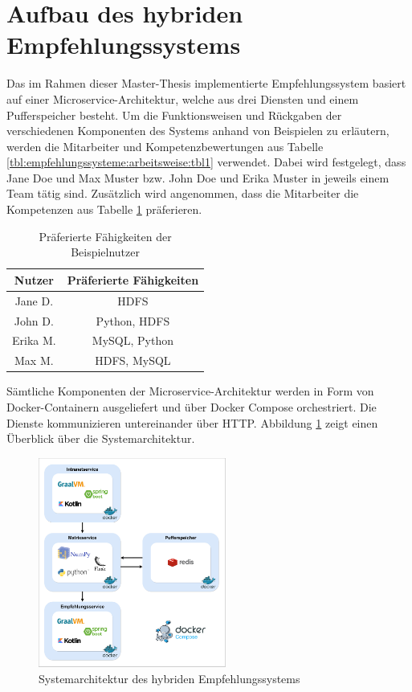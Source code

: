 \section{Aufbau des hybriden Empfehlungssystems}
\label{ch:methodik:versuchsaufbau:systemarchitektur}
Das im Rahmen dieser Master-Thesis implementierte Empfehlungssystem basiert auf einer Microservice-Architektur, welche aus drei Diensten und einem Pufferspeicher besteht. Um die Funktionsweisen und Rückgaben der verschiedenen Komponenten des Systems anhand von Beispielen zu erläutern, werden die Mitarbeiter und Kompetenzbewertungen aus Tabelle \ref{tbl:empfehlungssysteme:arbeitsweise:tbl1} verwendet. Dabei wird festgelegt, dass Jane Doe und Max Muster bzw. John Doe und Erika Muster in jeweils einem Team tätig sind. Zusätzlich wird angenommen, dass die Mitarbeiter die Kompetenzen aus Tabelle \ref{tbl:methodik:versuchsaufbau:systemarchitektur:tbl1} präferieren.

\begin{table}[h]
	\centering
	\begin{tabular}{c|c}
		\textbf{Nutzer} & \textbf{Präferierte Fähigkeiten}\\
		\hline
		Jane D.     & HDFS\\
		John D.     & Python, HDFS\\
		Erika M.    & MySQL, Python\\
		Max M.      & HDFS, MySQL
	\end{tabular}
	\caption{Präferierte Fähigkeiten der Beispielnutzer}
	\label{tbl:methodik:versuchsaufbau:systemarchitektur:tbl1}
\end{table}

Sämtliche Komponenten der Microservice-Architektur werden in Form von Docker-Containern ausgeliefert und über Docker Compose orchestriert. Die Dienste kommunizieren untereinander über HTTP. Abbildung \ref{fig:methodik:systemarchitekturn:abb1} zeigt einen Überblick über die Systemarchitektur.

\begin{figure}[h]
	\centering
	\includegraphics[width=0.55\textwidth]{gfx/ArchitekturMitLinie.jpg}
	\caption{Systemarchitektur des hybriden Empfehlungssystems}
	\label{fig:methodik:systemarchitekturn:abb1}
\end{figure}


